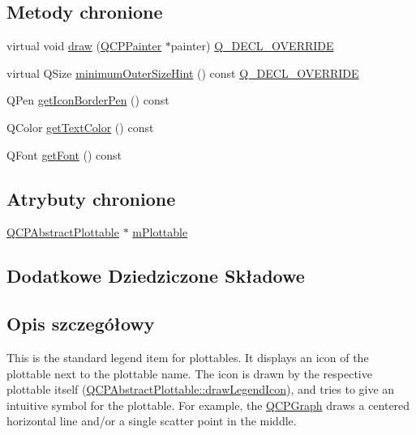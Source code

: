 \subsection*{Metody chronione}
\begin{DoxyCompactItemize}
\item 
virtual void \hyperlink{class_q_c_p_plottable_legend_item_a5838366619200e99680afa6d355d13fa}{draw} (\hyperlink{class_q_c_p_painter}{Q\+C\+P\+Painter} $\ast$painter) \hyperlink{qcustomplot_8hh_a42cc5eaeb25b85f8b52d2a4b94c56f55}{Q\+\_\+\+D\+E\+C\+L\+\_\+\+O\+V\+E\+R\+R\+I\+DE}
\item 
virtual Q\+Size \hyperlink{class_q_c_p_plottable_legend_item_a8b543f3ac32b2fe59326e01c1101b3b8}{minimum\+Outer\+Size\+Hint} () const \hyperlink{qcustomplot_8hh_a42cc5eaeb25b85f8b52d2a4b94c56f55}{Q\+\_\+\+D\+E\+C\+L\+\_\+\+O\+V\+E\+R\+R\+I\+DE}
\item 
Q\+Pen \hyperlink{class_q_c_p_plottable_legend_item_ab36270e6b022a6961fa44136f35c0e4b}{get\+Icon\+Border\+Pen} () const 
\item 
Q\+Color \hyperlink{class_q_c_p_plottable_legend_item_ad762b07439c738660ba93e78c1d03667}{get\+Text\+Color} () const 
\item 
Q\+Font \hyperlink{class_q_c_p_plottable_legend_item_a8a85c8a25affb4895423d730164d61de}{get\+Font} () const 
\end{DoxyCompactItemize}
\subsection*{Atrybuty chronione}
\begin{DoxyCompactItemize}
\item 
\hyperlink{class_q_c_p_abstract_plottable}{Q\+C\+P\+Abstract\+Plottable} $\ast$ \hyperlink{class_q_c_p_plottable_legend_item_ada647fb4b22971a1a424e15b4f6af0d9}{m\+Plottable}
\end{DoxyCompactItemize}
\subsection*{Dodatkowe Dziedziczone Składowe}


\subsection{Opis szczegółowy}
This is the standard legend item for plottables. It displays an icon of the plottable next to the plottable name. The icon is drawn by the respective plottable itself (\hyperlink{class_q_c_p_abstract_plottable_a9a450783fd9ed539e589999fd390cdf7}{Q\+C\+P\+Abstract\+Plottable\+::draw\+Legend\+Icon}), and tries to give an intuitive symbol for the plottable. For example, the \hyperlink{class_q_c_p_graph}{Q\+C\+P\+Graph} draws a centered horizontal line and/or a single scatter point in the middle.

